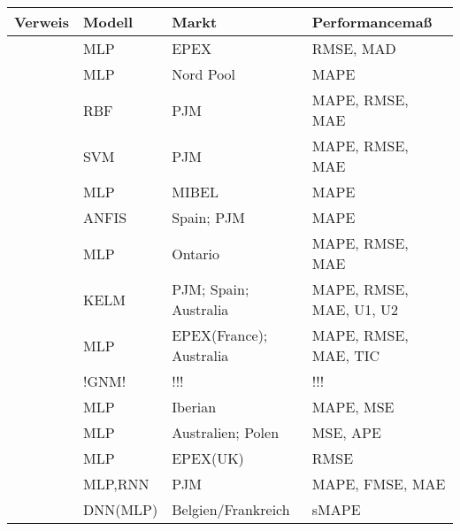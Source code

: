 \begin{table}[h]
\label{tab:ann_lit}
\caption{}
\begin{tabularx}{\textwidth}{llZZ}
\toprule
Verweis                 &  Modell   & Markt                     & Performancemaß            \\
\midrule
\citet{Keles2016}       & MLP       & EPEX                      & RMSE, MAD                 \\
\citet{Bobinaite2016}   & MLP       & Nord Pool                 & MAPE                      \\
\citet{Jiang2016}       & RBF       & PJM                       & MAPE, RMSE, MAE           \\
\citet{Feijoo2016}      & SVM       & PJM                       & MAPE, RMSE, MAE           \\
\citet{Monteiro2016}    & MLP       & MIBEL                     & MAPE                      \\
\citet{Osorio2016}      & ANFIS     & Spain; PJM                & MAPE                      \\
\citet{Sandhu2016}      & MLP       & Ontario                   & MAPE, RMSE, MAE           \\
\citet{Yang2017}        & KELM      & PJM; Spain; Australia     & MAPE, RMSE, MAE, U1, U2   \\
\citet{Wang2017}        & MLP       & EPEX(France); Australia   & MAPE, RMSE, MAE, TIC      \\
\citet{Singh2017}       & !GNM!       & !!!   & !!!      \\

\citet{Marcos2017}      & MLP       & Iberian                   & MAPE, MSE                 \\
\citet{Domanski2017}    & MLP       & Australien; Polen         & MSE, APE                  \\
\citet{Gao2017}         & MLP       & EPEX(UK)                  & RMSE                      \\
\citet{Mandal2017}      & MLP,RNN   & PJM                       & MAPE, FMSE, MAE           \\
\citet{Lago2018}        & DNN(MLP)  & Belgien/Frankreich        & sMAPE                     \\


\bottomrule
\end{tabularx}
\end{table}